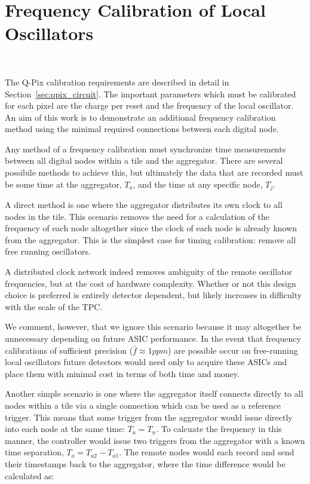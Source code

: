 \section{Frequency Calibration of Local Oscillators}~\label{sec:calib}

The Q-Pix calibration requirements are described in detail in Section~\ref{sec:qpix_circuit}.
The important parameters which must be calibrated for each pixel are the charge per reset and the frequency of the local oscillator.
An aim of this work is to demonstrate an additional frequency calibration method using the minimal required connections between each digital node.

Any method of a frequency calibration must synchronize time measurements between all digital nodes within a tile and the aggregator.
There are several possibile methods to achieve this, but ultimately the data that are recorded must be some time at the aggregator, $T_{a}$, and the time at any specific node, $T_{j}$.

A direct method is one where the aggregator distributes its own clock to all nodes in the tile.
This scenario removes the need for a calculation of the frequency of each node altogether since the clock of each node is already known from the aggregator.
This is the simplest case for timing calibration: remove all free running oscillators.

A distributed clock network indeed removes ambiguity of the remote oscillator frequencies, but at the cost of hardware complexity.
Whether or not this design choice is preferred is entirely detector dependent, but likely increases in difficulty with the scale of the TPC.

We comment, however, that we ignore this scenario because it may altogether be unnecessary depending on future ASIC performance.
In the event that frequency calibrations of sufficient precision ($\bar{f} \approx 1 ppm$) are possible occur on free-running local oscillators future detectors would need only to acquire these ASICs and place them with minimal cost in terms of both time and money.

Another simple scenario is one where the aggregator itself connects directly to all nodes within a tile via a single connection which can be used as a reference trigger.
This means that some trigger from the aggregator would issue directly into each node at the same time: $T_{a} = T_{n}$.
To calcuate the frequency in this manner, the controller would issue two triggers from the aggregator with a known time separation, $T_{o} = T_{a2} - T_{a1}$.
The remote nodes would each record and send their timestamps back to the aggregator, where the time difference would be calculated as:

